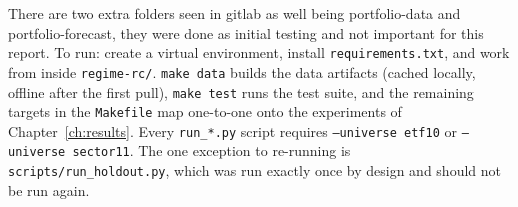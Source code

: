 There are two extra folders seen in gitlab as well being portfolio-data and portfolio-forecast, they were done as initial testing and not important for this report. To run: create a virtual environment, install \texttt{requirements.txt}, and
work from inside \texttt{regime-rc/}. \texttt{make data} builds the data
artifacts (cached locally, offline after the first pull), \texttt{make test}
runs the test suite, and the remaining targets in the \texttt{Makefile} map
one-to-one onto the experiments of Chapter~\ref{ch:results}. Every
\texttt{run\_*.py} script requires \texttt{--universe etf10} or
\texttt{--universe sector11}. The one exception to re-running is
\texttt{scripts/run\_holdout.py}, which was run exactly once by design and
should not be run again.

